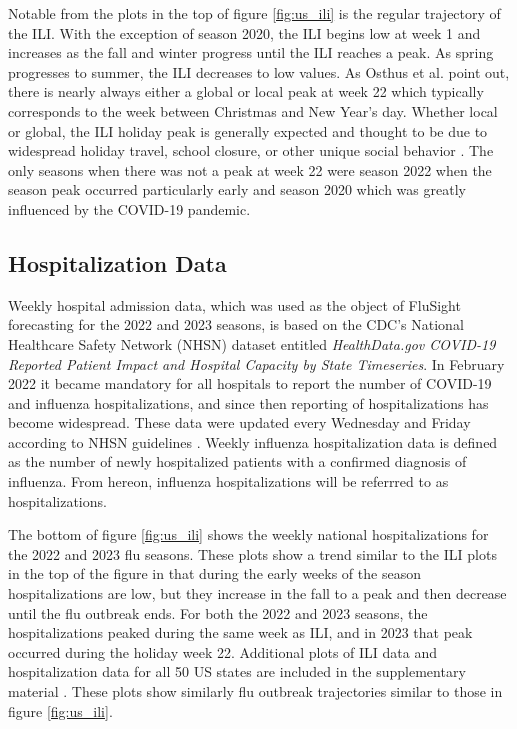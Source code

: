 Notable from the plots in the top of figure \ref{fig:us_ili} is the regular 
trajectory of the ILI. With the exception of season 2020, the ILI begins low 
at week 1 and increases as the fall and winter progress until the ILI reaches 
a peak. As spring progresses to summer, the ILI decreases to low values. As 
Osthus et al. \cite[]{osthus2019dynamic} point out, there is nearly always 
either a global or local peak at week 22 which typically corresponds to the 
week between Christmas and New Year's day. 
Whether local or global, the ILI holiday peak is generally expected and thought 
to be due to widespread holiday travel, school closure, or other unique social 
behavior   
\cite[]{ewing2017contact, garza2013effect}.
The only seasons when there was not a peak at week 22 were season 2022 when 
the season peak occurred particularly early and season 2020 which was greatly 
influenced by the COVID-19 pandemic. 









\subsection{Hospitalization Data}

Weekly hospital admission data, which was used as the object of FluSight 
forecasting for the 
2022 and 2023 seasons, is based on the CDC's National Healthcare Safety 
Network (NHSN) dataset entitled \textit{HealthData.gov COVID-19 Reported 
Patient Impact and Hospital Capacity by State Timeseries}. 
In February 2022 it became mandatory for 
all hospitals to report the number of COVID-19 and influenza hospitalizations, 
and since then reporting of hospitalizations has become widespread. These data 
were updated every Wednesday and Friday according to NHSN guidelines 
\cite[]{healthdata2024covidts}. Weekly influenza hospitalization data is
defined as the number of newly hospitalized patients with a confirmed diagnosis 
of influenza. From hereon, influenza hospitalizations
will be referrred to as hospitalizations.

The bottom of figure \ref{fig:us_ili} shows the weekly national 
hospitalizations for the 2022 and 2023 flu seasons. These plots show a 
trend similar to the ILI plots in the top of the figure in that during the early 
weeks of the season hospitalizations are low, but they increase in the fall 
to a peak and then decrease until the flu outbreak ends. For both the 
2022 and 2023 seasons, the hospitalizations peaked during the same week as 
ILI, and in 2023 that peak occurred during the holiday week 22. Additional 
plots of ILI data and hospitalization
data for all 50 US states are included in the supplementary material 
\cite[]{wadsworth2024bas}. These plots show similarly flu outbreak trajectories 
similar to those in figure \ref{fig:us_ili}. 


